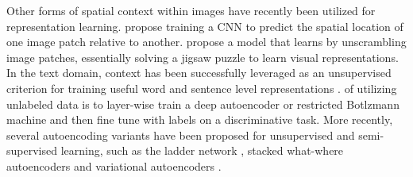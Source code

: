 \documentclass{article} %
\newcommand{\fig}[1]{Fig.~\ref{fig:#1}}
\def\etal{{\textit{et~al.~}}}
\begin{document}
Other forms of spatial context within images have recently been
utilized for representation learning.  
\cite{doersch2015} propose training a CNN to predict the spatial
location of one image patch relative to another.  
\cite{noroozi2016} propose a model that learns by unscrambling image
patches, essentially solving a jigsaw puzzle to learn visual
representations. In the text domain, context has been successfully
leveraged as an unsupervised criterion for training useful word and
sentence level representations \citep{collobert2011, mikolov2013,
  kiros2015}.  
of utilizing unlabeled data is to layer-wise train a deep autoencoder
or restricted Botlzmann machine \citep{hinton2006} and then fine tune
with labels on a discriminative task.  More recently, several
autoencoding variants have been proposed for unsupervised and
semi-supervised learning, such as the ladder network \citep{ramus2015},
stacked what-where autoencoders \citep{zhao2016} and variational
autoencoders \citep{kingma2014a, kingma2014b}.
\end{document}
